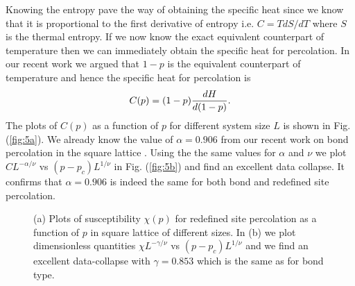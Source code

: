 \documentclass[twocolumn,showpacs,preprintnumbers,amsmath,amssymb]{article}
\begin{document}
 Knowing the entropy pave the way of obtaining the
specific heat since we know that it is proportional to the first derivative of entropy
i.e. $C=TdS/dT$ where $S$ is the thermal entropy. If we now know the exact equivalent 
counterpart of temperature
then we can immediately obtain the specific heat for percolation. In our recent work we
argued that $1-p$ is the equivalent counterpart of temperature and hence the specific
heat for percolation is 
\begin{equation}
C(p)=(1-p){{dH}\over{d(1-p)}}.
\end{equation}
 The plots of $C(p)$ as a function of $p$ for different
system size $L$ is shown in Fig. (\ref{fig:5a}). 
We already know the value of $\alpha=0.906$ from our recent work on bond percolation in
the square lattice \cite{ref.hassan_didar}. Using the the same values for $\alpha$ and $\nu$
we plot $CL^{-\alpha/\nu}$ vs $(p-p_c)L^{1/\nu}$ in Fig. (\ref{fig:5b}) and find an excellent 
data collapse. It confirms that $\alpha= 0.906$ is indeed the
same for both bond and redefined site percolation.



\begin{figure}

\centering



\subfloat[]
{
\label{fig:6a}
}

\subfloat[]
{
\label{fig:6b}
}
\caption{(a) Plots of susceptibility $\chi(p)$ for redefined site percolation as a
function of $p$ in square lattice of different sizes. 
 In (b) we plot dimensionless quantities $\chi L^{-\gamma/\nu}$ vs $(p-p_c)L^{1/\nu}$ and we find an excellent data-collapse with $\gamma=0.853$ which is the same as for bond type.
} 

\label{fig:6ab}
\end{figure}
\end{document}
